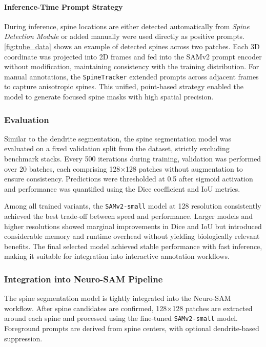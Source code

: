 \paragraph{Inference-Time Prompt Strategy}

During inference, spine locations are either detected automatically from \textit{Spine Detection Module} or added manually were used directly as positive prompts. \autoref{fig:tube_data} shows an example of detected spines across two patches. Each 3D coordinate was projected into 2D frames and fed into the \gls{SAMv2} prompt encoder without modification, maintaining consistency with the training distribution. For manual annotations, the \texttt{SpineTracker} extended prompts across adjacent frames to capture anisotropic spines. This unified, point-based strategy enabled the model to generate focused spine masks with high spatial precision.

\subsubsection{\textbf{Evaluation}}
Similar to the dendrite segmentation, the spine segmentation model was evaluated on a fixed validation split from the dataset, strictly excluding benchmark stacks. Every 500 iterations during training, validation was performed over 20 batches, each comprising 128$\times$128 patches without augmentation to ensure consistency. Predictions were thresholded at 0.5 after sigmoid activation and performance was quantified using the Dice coefficient and \gls{IoU} metrics.

Among all trained variants, the \texttt{\gls{SAMv2}-small} model at 128 resolution consistently achieved the best trade-off between speed and performance. Larger models and higher resolutions showed marginal improvements in Dice and \gls{IoU} but introduced considerable memory and runtime overhead without yielding biologically relevant benefits. The final selected model achieved stable performance with fast inference, making it suitable for integration into interactive annotation workflows.

\subsubsection{\textbf{Integration into Neuro-\gls{SAM} Pipeline}}
The spine segmentation model is tightly integrated into the Neuro-\gls{SAM} workflow. After spine candidates are confirmed, 128$\times$128 patches are extracted around each spine and processed using the fine-tuned \texttt{\gls{SAMv2}-small} model. Foreground prompts are derived from spine centers, with optional dendrite-based suppression.

